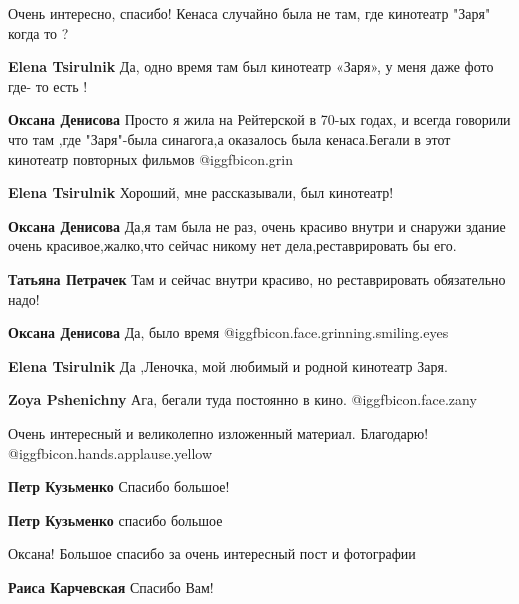 \begin{itemize}
Очень интересно, спасибо! Кенаса случайно была не там, где кинотеатр "Заря" когда то ?

\begin{itemize} %
\textbf{Elena Tsirulnik} Да, одно время там был кинотеатр «Заря», у меня даже фото где- то есть !

\begin{itemize} %
\textbf{Оксана Денисова} Просто я жила на Рейтерской в 70-ых годах, и всегда говорили что там ,где "Заря"-была синагога,а оказалось была кенаса.Бегали в этот кинотеатр повторных фильмов  @igg{fbicon.grin} 

\textbf{Elena Tsirulnik} Хороший, мне рассказывали, был кинотеатр!

\textbf{Оксана Денисова} Да,я там была не раз, очень красиво внутри и снаружи здание очень красивое,жалко,что сейчас никому нет дела,реставрировать бы его.

\textbf{Татьяна Петрачек} Там и сейчас внутри красиво, но реставрировать обязательно надо!

\textbf{Оксана Денисова} Да, было время @igg{fbicon.face.grinning.smiling.eyes} 
\end{itemize} %

\textbf{Elena Tsirulnik} Да ,Леночка, мой любимый и родной кинотеатр Заря.

\begin{itemize} %
\textbf{Zoya Pshenichny} Ага, бегали туда постоянно в кино. @igg{fbicon.face.zany} 
\end{itemize} %

\end{itemize} %

Очень интересный и великолепно изложенный материал. Благодарю!  @igg{fbicon.hands.applause.yellow} 

\begin{itemize} %
\textbf{Петр Кузьменко} Спасибо большое!

\textbf{Петр Кузьменко} спасибо большое
\end{itemize} %

Оксана!
Большое спасибо за очень интересный пост и фотографии

\begin{itemize} %
\textbf{Раиса Карчевская} Спасибо Вам!
\end{itemize} %


\end{itemize}
